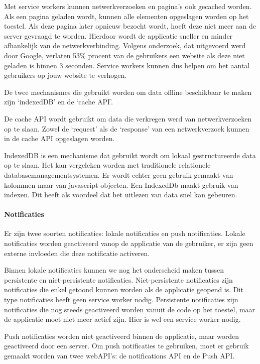 Met service workers kunnen netwerkverzoeken en pagina’s ook gecached worden. Als een pagina geladen wordt, kunnen alle elementen opgeslagen worden op het toestel. Als deze pagina later opnieuw bezocht wordt, hoeft deze niet meer aan de server gevraagd te worden. Hierdoor wordt de applicatie sneller en minder afhankelijk van de netwerkverbinding.
Volgens onderzoek, dat uitgevoerd werd door Google, verlaten 53\% procent van de gebruikers een website als deze niet geladen is binnen 3 seconden. Service workers kunnen dus helpen om het aantal gebruikers op jouw website te verhogen.

\autocite{Google2017}

De twee mechanismes die gebruikt worden om data offline beschikbaar te maken zijn ‘indexedDB’ en de ‘cache API’.
\autocite{Osmani2019}
\autocite{Mozilla2020a}

De cache API wordt gebruikt om data die verkregen werd van netwerkverzoeken op te slaan. Zowel de ‘request’ als de ‘response’ van een netwerkverzoek kunnen in de cache API opgeslagen worden.
\autocite{Scales2019}


IndexedDB is een mechanisme dat gebruikt wordt om lokaal gestructureerde data op te slaan. Het kan vergeleken worden met traditionele relationele databasemanagementsystemen. Er wordt echter geen gebruik gemaakt van kolommen maar van javascript-objecten. 
Een IndexedDb maakt gebruik van indexen. Dit heeft als voordeel dat het uitlezen van data snel kan gebeuren.
\autocite{Mozilla2019}


\paragraph{Notificaties}

Er zijn twee soorten notificaties: lokale notificaties en push notificaties. 
Lokale notificaties worden geactiveerd vanop de applicatie van de gebruiker, er zijn geen externe invloeden die deze notificatie activeren.

Binnen lokale notificaties kunnen we nog het onderscheid maken tussen persistente en niet-persistente notificaties.
Niet-persistente notificaties zijn notificaties die enkel getoond kunnen worden als de applicatie geopend is. Dit type notificaties heeft geen service worker nodig. 
Persistente notificaties zijn notificaties die nog steeds geactiveerd worden vanuit de code op het toestel, maar de applicatie moet niet meer actief zijn. Hier is wel een service worker nodig.

Push notificaties worden niet geactiveerd binnen de applicatie, maar worden geactiveerd door een server.
Om push notificaties te gebruiken, moet er gebruik gemaakt worden van twee webAPI’s: de notifications API en de Push API.

